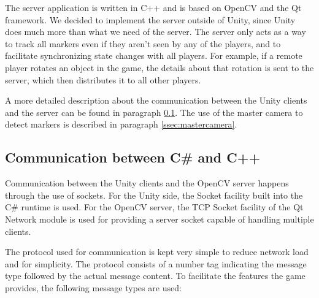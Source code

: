        The server application is written in C++ and is based on OpenCV and the 
        Qt framework. We decided to implement the server outside of Unity, since 
        Unity does much more than what we need of the server. The server only 
        acts as a way to track all markers even if they aren't seen by any of 
        the players, and to facilitate synchronizing state changes with all 
        players. For example, if a remote player rotates an object in the game, 
        the details about that rotation is sent to the server, which then 
        distributes it to all other players.
        
        A more detailed description about the communication between the Unity 
        clients and the server can be found in paragraph \ref{ssec:communication}.
        The use of the master camera to detect markers is described in paragraph
        \ref{ssec:mastercamera}.
                
        \subsection{Communication between C\# and C++} \label{ssec:communication}
            Communication between the Unity clients and the OpenCV server 
            happens through the use of sockets. For the Unity side, the Socket 
            facility built into the C\# runtime is used. For the OpenCV server, 
            the TCP Socket facility of the Qt Network module is used for 
            providing a server socket capable of handling multiple clients. 
            
            The protocol used for communication is kept very simple to reduce 
            network load and for simplicity. The protocol consists of a number
            tag indicating the message type followed by the actual message 
            content. To facilitate the features the game provides, the following
            message types are used:
            
